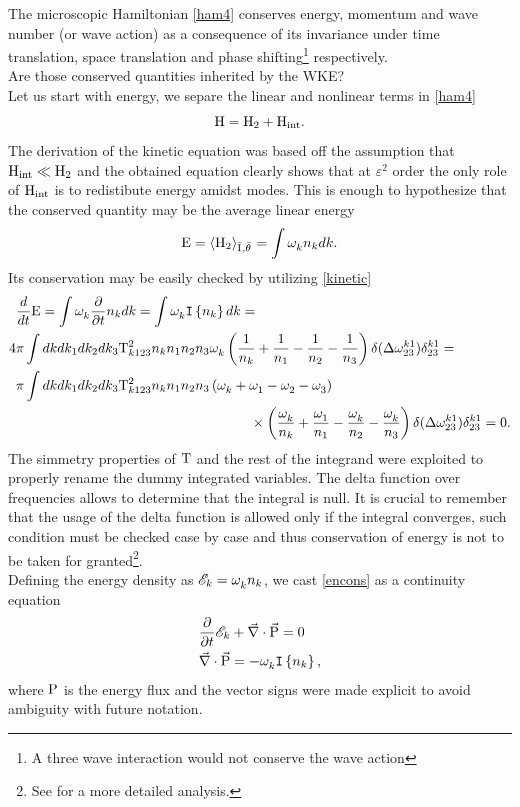 The microscopic Hamiltonian \eqref{ham4} conserves energy, momentum and wave number (or wave action) as a consequence of its invariance under time translation,
space translation and phase shifting\footnote{A three wave interaction would not conserve the wave action} respectively. \\
Are those conserved quantities inherited by the WKE?\\
Let us start with energy, we separe the linear and nonlinear terms in \eqref{ham4}
\begin{equation}
    \mathrm{H} = \mathrm{H}_2 + \mathrm{H}_{\text{int}}.
\end{equation}
The derivation of the kinetic equation was based off the assumption that $\mathrm{H}_{\text{int}} \ll \mathrm{H}_{2}$ and the obtained equation clearly shows that at $\varepsilon^2$ 
order the only role of $\mathrm{H}_{\text{int}}$ is to redistibute energy amidst modes. This is enough to hypothesize that the conserved quantity may be the average linear energy
\begin{equation}
    \mathrm{E} = \left\langle \mathrm{H}_2 \right\rangle_{\bar{\mathrm{I}^{}},\bar{\theta}^{}} = \int \omega^{}_k n_k dk.
\end{equation}
Its conservation may be easily checked by utilizing \eqref{kinetic} 
\begin{align}
    &\dt \Ewav = \int \omga_k \pt n_k dk = \int \omga_k \coll dk = \label{encons}\\
    4 &\pi\int  dk dk_1 dk_2 dk_3 
    \Tint^2_{k123}n_kn_1n_2n_3 \omga_k
    \left(\frac{1}{n_k} + \frac{1}{n_1} - \frac{1}{n_2}- \frac{1}{n_3}  \right)
    \delta(\delomega^{k1}_{23})\delta^{k1}_{23} = \\
    &\pi\int  dk dk_1 dk_2 dk_3 
    \Tint^2_{k123}n_kn_1n_2n_3\left(\omga_k + \omga_1 - \omga_2 - \omga_3\right) \\
    & \hspace{6cm}\times\left(\frac{\omga_k}{n_k} + \frac{\omga_1}{n_1} - \frac{\omga_k}{n_2}- \frac{\omga_k}{n_3}  \right)
    \delta(\delomega^{k1}_{23})\delta^{k1}_{23} = 0.    
\end{align}
The simmetry properties of $\mathrm{T}$ and the rest of the integrand were exploited to properly rename the dummy integrated variables. The delta function over frequencies 
allows to determine that the integral is null. It is crucial to remember that the usage of the delta function is allowed only if the integral converges, such condition
must be checked case by case and thus conservation of energy is not to be taken for granted\footnote{See \cite{Zakharov} for a more detailed analysis.}. \\
Defining the energy density as $\mathscr{E}_k = \omega^{}_k n_k$, we cast \eqref{encons} as a continuity equation
\begin{align}
    &\frac{\partial}{\partial t} \mathscr{E}_k + \vec{\nabla}\cdot\vec{\mathrm{P}} = 0 \label{Econtinuity}\\
    &\vec{\nabla}\cdot\vec{\mathrm{P}} = -\omega^{}_k \mathtt{I}\left\{n_k\right\}, 
\end{align}
where $\mathrm{P}$ is the energy flux and the vector signs were made explicit to avoid ambiguity with future notation. \\

